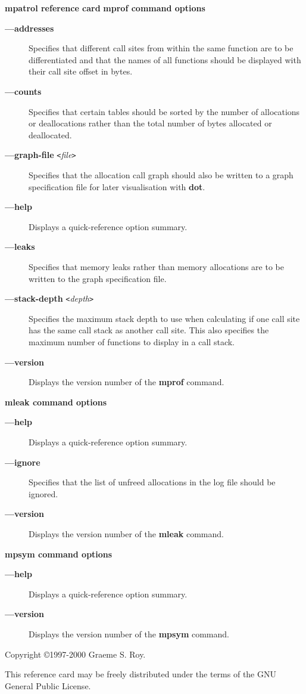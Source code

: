\documentclass[a4paper,landscape,final]{article}
\newcommand{\heading}[1]{\textbf{\normalsize #1}}
\newcommand{\command}[1]{\textbf{#1}}
\newcommand{\flag}[1]{\textbf{---#1}}
\newcommand{\flagpar}[2]{\flag{#1} \texttt{<}\textit{#2}\texttt{>}}
\begin{document}
\begin{multicols}{3}{\textbf{\Large mpatrol reference card}}
\vskip 12pt
\heading{mprof command options}
\vskip 6pt

\begin{description}
\item[\flag{addresses}]
Specifies that different call sites from within the same function are to be
differentiated and that the names of all functions should be displayed with
their call site offset in bytes.
\item[\flag{counts}]
Specifies that certain tables should be sorted by the number of allocations or
deallocations rather than the total number of bytes allocated or deallocated.
\item[\flagpar{graph-file}{file}]
Specifies that the allocation call graph should also be written to a graph
specification file for later visualisation with \command{dot}.
\item[\flag{help}]
Displays a quick-reference option summary.
\item[\flag{leaks}]
Specifies that memory leaks rather than memory allocations are to be written to
the graph specification file.
\item[\flagpar{stack-depth}{depth}]
Specifies the maximum stack depth to use when calculating if one call site has
the same call stack as another call site.  This also specifies the maximum
number of functions to display in a call stack.
\item[\flag{version}]
Displays the version number of the \command{mprof} command.
\end{description}

\vskip 12pt
\heading{mleak command options}
\vskip 6pt

\begin{description}
\item[\flag{help}]
Displays a quick-reference option summary.
\item[\flag{ignore}]
Specifies that the list of unfreed allocations in the log file should be
ignored.
\item[\flag{version}]
Displays the version number of the \command{mleak} command.
\end{description}

\vskip 12pt
\heading{mpsym command options}
\vskip 6pt

\begin{description}
\item[\flag{help}]
Displays a quick-reference option summary.
\item[\flag{version}]
Displays the version number of the \command{mpsym} command.
\end{description}

\vskip 12pt
Copyright \copyright 1997-2000 Graeme S. Roy.
\vskip 6pt

This reference card may be freely distributed under the terms of the GNU General
Public License.

\end{multicols}
\end{document}
